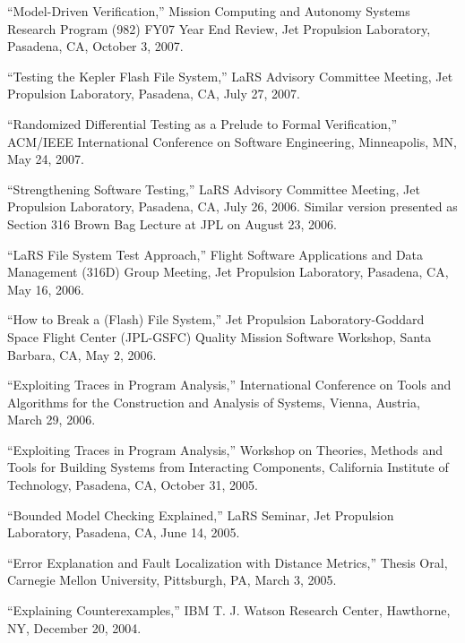\documentclass[ComputerScience]{vita}
\begin{document}
\begin{vita}
\begin{Selected Presentations}
\item ``Model-Driven Verification,'' Mission Computing and Autonomy Systems Research Program (982) FY07 Year End Review, Jet Propulsion Laboratory, Pasadena, CA, October 3, 2007.

\item ``Testing the Kepler Flash File System,'' LaRS Advisory Committee Meeting, Jet Propulsion Laboratory, Pasadena, CA, July 27, 2007.

\item ``Randomized Differential Testing as a Prelude to Formal Verification,'' ACM/IEEE International Conference on Software Engineering, Minneapolis, MN, May 24, 2007.

\item ``Strengthening Software Testing,'' LaRS Advisory Committee Meeting, Jet Propulsion Laboratory, Pasadena, CA, July 26, 2006.  Similar version presented as Section 316 Brown Bag Lecture at JPL on August 23, 2006.

\item ``LaRS File System Test Approach,'' Flight Software Applications and Data Management (316D) Group Meeting, Jet Propulsion Laboratory, Pasadena, CA, May 16, 2006.

\item ``How to Break a (Flash) File System,'' Jet Propulsion Laboratory-Goddard Space Flight Center (JPL-GSFC) Quality Mission Software Workshop, Santa Barbara, CA, May 2, 2006.

 \item ``Exploiting Traces in Program Analysis,'' International Conference on Tools and Algorithms for the Construction and Analysis of Systems, Vienna, Austria, March 29, 2006.

 \item ``Exploiting Traces in Program Analysis,'' Workshop on Theories, Methods and Tools for Building Systems from Interacting Components, California Institute of Technology, Pasadena, CA, October 31, 2005.

 \item ``Bounded Model Checking Explained,'' LaRS Seminar, Jet Propulsion Laboratory, Pasadena, CA, June 14, 2005.

 \item ``Error Explanation and Fault Localization with Distance Metrics,'' Thesis Oral, Carnegie Mellon University, Pittsburgh, PA, March 3, 2005.

  \item ``Explaining Counterexamples,'' IBM T. J. Watson Research Center, Hawthorne, NY, December 20, 2004.


\end{Selected Presentations}
\end{vita}
\end{document}
